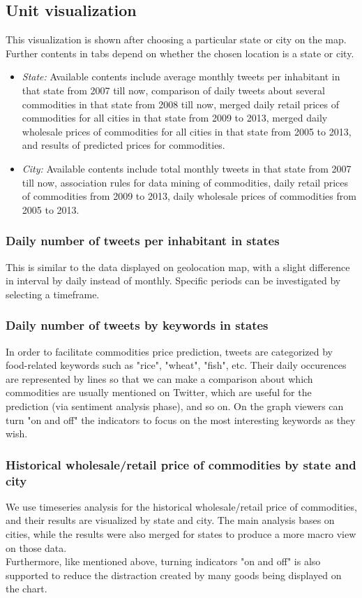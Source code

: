 \subsection*{Unit visualization}
This visualization is shown after choosing a particular state or city on the map. Further contents in tabs depend on whether the chosen location is a state or city.
\begin{itemize}
\item \emph{State:} Available contents include average monthly tweets per inhabitant in that state from 2007 till now, comparison of daily tweets about several commodities in that state from 2008 till now, merged daily retail prices of commodities for all cities in that state from 2009 to 2013, merged daily wholesale prices of commodities for all cities in that state from 2005 to 2013, and results of predicted prices for commodities.
\item \emph{City:} Available contents include total monthly tweets in that state from 2007 till now, association rules for data mining of commodities, daily retail prices of commodities from 2009 to 2013, daily wholesale prices of commodities from 2005 to 2013.\\
\end{itemize}

\subsubsection*{Daily number of tweets per inhabitant in states}
This is similar to the data displayed on geolocation map, with a slight difference in interval by daily instead of monthly. Specific periods can be investigated by selecting a timeframe.

\subsubsection*{Daily number of tweets by keywords in states}
In order to facilitate commodities price prediction, tweets are categorized by food-related keywords such as "rice", "wheat", "fish", etc. Their daily occurences are represented by lines so that we can make a comparison about which commodities are usually mentioned on Twitter, which are useful for the prediction (via sentiment analysis phase), and so on. On the graph viewers can turn "on and off" the indicators to focus on the most interesting keywords as they wish.

\subsubsection*{Historical wholesale/retail price of commodities by state and city}
We use timeseries analysis for the historical wholesale/retail price of commodities, and their results are visualized by state and city. The main analysis bases on cities, while the results were also merged for states to produce a more macro view on those data.\\
Furthermore, like mentioned above, turning indicators "on and off" is also supported to reduce the distraction created by many goods being displayed on the chart.

